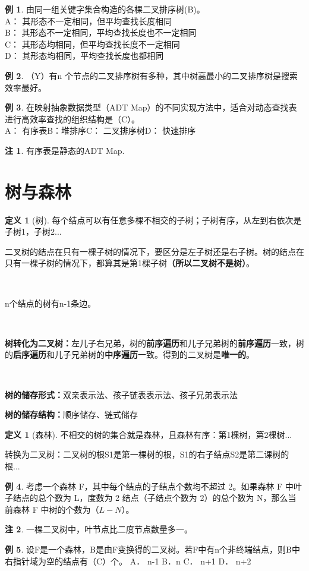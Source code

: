 \documentclass[hyperref,a4paper,UTF8,12pt]{ctexart}
\theoremstyle{definition}
\newtheorem{definition}[theorem]{定义}
\newtheorem{example}{例}[section]
\newtheorem*{remark}{注}
\begin{document}
\begin{example}
    由同一组关键字集合构造的各棵二叉排序树(B)。\\
A： 其形态不一定相同，但平均查找长度相同\\
B： 其形态不一定相同，平均查找长度也不一定相同\\
C： 其形态均相同，但平均查找长度不一定相同\\
D： 其形态均相同，平均查找长度也都相同
\end{example}
\begin{example}
    （Y）有n 个节点的二叉排序树有多种，其中树高最小的二叉排序树是搜索效率最好。
\end{example}
\begin{example}
    在映射抽象数据类型（ADT Map）的不同实现方法中，适合对动态查找表进行高效率查找的组织结构是（C）。\\
A： 有序表\quad B：堆排序\quad C： 二叉排序树\quad D： 快速排序
\end{example}
\begin{remark}
    有序表是静态的ADT Map.
\end{remark}

\section{树与森林}
\begin{definition}[树]
    每个结点可以有任意多棵不相交的子树；子树有序，从左到右依次是子树1，子树2...
\end{definition}
二叉树的结点在只有一棵子树的情况下，要区分是左子树还是右子树。树的结点在只有一棵子树的情况下，都算其是第1棵子树\textbf{（所以二叉树不是树）}。

\ 

n个结点的树有n-1条边。

\ 

\textbf{树转化为二叉树：}左儿子右兄弟，树的\textbf{前序遍历}和儿子兄弟树的\textbf{前序遍历}一致，树的\textbf{后序遍历}和儿子兄弟树的\textbf{中序遍历}一致。得到的二叉树是\textbf{唯一的}。

\ 

\textbf{树的储存形式：}双亲表示法、孩子链表表示法、孩子兄弟表示法

\textbf{树的储存结构：}顺序储存、链式储存

\begin{definition}[森林]
    不相交的树的集合就是森林，且森林有序：第1棵树，第2棵树...
\end{definition}
转换为二叉树：二叉树的根S1是第一棵树的根，S1的右子结点S2是第二课树的根...
\begin{example}
    考虑一个森林 F，其中每个结点的子结点个数均不超过 2。如果森林 F 中叶子结点的总个数为 L，度数为 2 结点（子结点个数为 2）的总个数为 N，那么当前森林 F 中树的个数为（$L-N$）。
\end{example}
\begin{remark}
    一棵二叉树中，叶节点比二度节点数量多一。
\end{remark}
\begin{example}
    设F是一个森林，B是由F变换得的二叉树。若F中有n个非终端结点，则B中右指针域为空的结点有（C）个。
A． n-1 \quad   B．n   \quad   C． n+1   \quad   D． n+2
\end{example}
\end{document}
